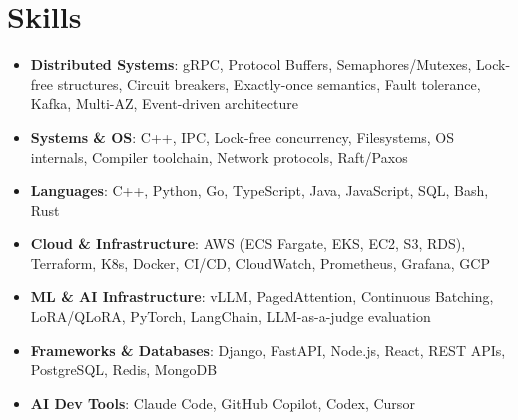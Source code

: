 \documentclass[letterpaper,11pt]{article}
\newcommand{\resumeSubHeadingListStart}{\begin{itemize}[leftmargin=0.15in, label={}]}
\newcommand{\resumeSubHeadingListEnd}{\end{itemize}}
\newcommand{\resumeSkillHeading}[2]{%
  \item\small{\textbf{#1}: #2 \vspace{-9pt}}%
}
\begin{document}
\section{Skills}
  \resumeSubHeadingListStart
    \resumeSkillHeading{Distributed Systems}{gRPC, Protocol Buffers, Semaphores/Mutexes, Lock-free structures, Circuit breakers, Exactly-once semantics, Fault tolerance, Kafka, Multi-AZ, Event-driven architecture}
    \resumeSkillHeading{Systems \& OS}{C++, IPC, Lock-free concurrency, Filesystems, OS internals, Compiler toolchain, Network protocols, Raft/Paxos}
    \resumeSkillHeading{Languages}{C++, Python, Go, TypeScript, Java, JavaScript, SQL, Bash, Rust}
    \resumeSkillHeading{Cloud \& Infrastructure}{AWS (ECS Fargate, EKS, EC2, S3, RDS), Terraform, K8s, Docker, CI/CD, CloudWatch, Prometheus, Grafana, GCP}
    \resumeSkillHeading{ML \& AI Infrastructure}{vLLM, PagedAttention, Continuous Batching, LoRA/QLoRA, PyTorch, LangChain, LLM-as-a-judge evaluation}
    \resumeSkillHeading{Frameworks \& Databases}{Django, FastAPI, Node.js, React, REST APIs, PostgreSQL, Redis, MongoDB}
    \resumeSkillHeading{AI Dev Tools}{Claude Code, GitHub Copilot, Codex, Cursor}
  \resumeSubHeadingListEnd
\end{document}
